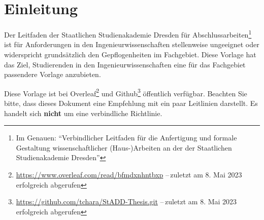 \chapter{Einleitung}\label{chap:Intro}
Der Leitfaden der Staatlichen Studienakademie Dresden für Abschlussarbeiten\footnote{\label{fn:Leitfaden}Im Genauen: \enquote{Verbindlicher Leitfaden für die Anfertigung und formale Gestaltung wissenschaftlicher (Haus-)Arbeiten an der der Staatlichen Studienakademie Dresden}} ist für Anforderungen in den Ingenieurwissenschaften stellenweise ungeeignet oder widerspricht grundsätzlich den Gepflogenheiten im Fachgebiet. Diese Vorlage hat das Ziel, Studierenden in den Ingenieurwissenschaften eine für das Fachgebiet passendere Vorlage anzubieten.

Diese Vorlage ist bei Overleaf\footnote{\url{https://www.overleaf.com/read/bfmdxnhntbxp} --\,zuletzt am 8. Mai 2023 erfolgreich abgerufen} und Github\footnote{\url{https://github.com/tchara/StADD-Thesis.git} --\,zuletzt am 8. Mai 2023 erfolgreich abgerufen} öffentlich verfügbar. Beachten Sie bitte, dass dieses Dokument eine Empfehlung mit ein paar Leitlinien darstellt. Es handelt sich \textbf{nicht} um eine verbindliche Richtlinie.

